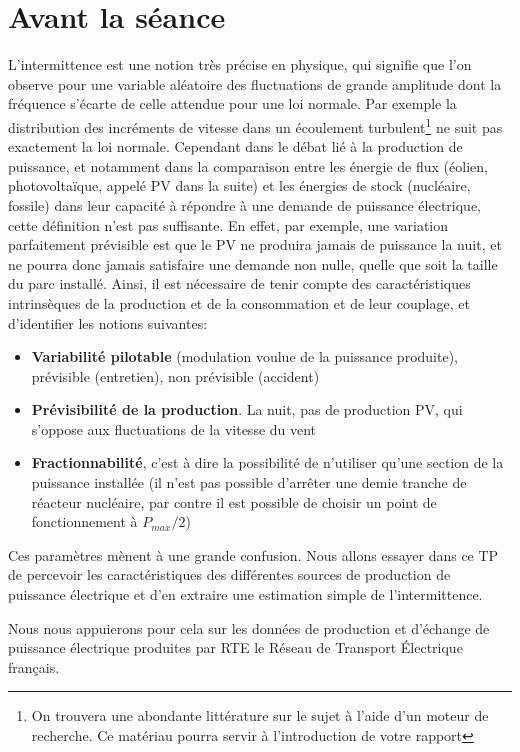 \documentclass[12pt,french]{article}
\begin{document}
\section{Avant la séance}
\label{sec:avant}
L'intermittence est une notion très précise en physique, qui signifie que
l'on observe pour une variable aléatoire des fluctuations de grande amplitude dont la fréquence s'écarte de celle attendue pour une loi normale. Par exemple la distribution des incréments de vitesse dans un écoulement turbulent\footnote{On trouvera une abondante littérature sur le sujet à l'aide d'un moteur de recherche. Ce matériau pourra servir à l'introduction de votre rapport}  ne suit pas exactement la loi normale.
Cependant dans le débat lié à
la production de puissance, et notamment dans la comparaison entre les
énergie de flux (éolien, photovoltaïque, appelé PV dans la suite) et les énergies de stock (nucléaire,
fossile) dans leur capacité à répondre à une demande de puissance
électrique, cette définition n'est pas suffisante. En effet, par exemple,
une variation parfaitement prévisible est que le PV ne produira jamais de
puissance la nuit, et ne pourra donc jamais satisfaire une demande non nulle, quelle que
soit la taille du parc installé. Ainsi, il est nécessaire de tenir compte
des caractéristiques intrinsèques de la production et de la consommation et
de leur couplage, et d'identifier les notions suivantes:
\begin{itemize}
  \item \textbf{Variabilité pilotable} (modulation voulue de la puissance produite), prévisible (entretien), non prévisible (accident)
  
  \item \textbf{Prévisibilité de la production}. La nuit, pas de production PV, qui s'oppose aux fluctuations de la vitesse du vent
  
  \item \textbf{Fractionnabilité}, c'est à dire la possibilité de n'utiliser qu'une
  section de la puissance installée (il n'est pas possible d'arrêter une demie tranche de réacteur nucléaire, par contre il est possible de choisir un point de fonctionnement à $P_{max}/2$)  
\end{itemize}
Ces paramètres mènent à une grande confusion. Nous allons essayer dans ce
TP de percevoir les caractéristiques des différentes sources de production
de puissance électrique et d'en extraire une estimation simple de
l'intermittence.

Nous nous appuierons pour cela sur les données de production et d'échange de puissance électrique produites par RTE le Réseau de Transport Électrique français.
\end{document}
